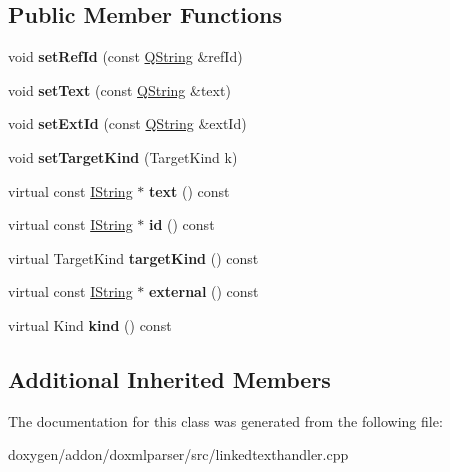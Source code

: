 \subsection*{Public Member Functions}
\begin{DoxyCompactItemize}
\item 
\mbox{\label{class_l_t___ref_aa58a1fa144b337d4412f461280213764}} 
void {\bfseries set\+Ref\+Id} (const \mbox{\hyperlink{class_q_string}{Q\+String}} \&ref\+Id)
\item 
\mbox{\label{class_l_t___ref_ab32809080285a478f177582906941142}} 
void {\bfseries set\+Text} (const \mbox{\hyperlink{class_q_string}{Q\+String}} \&text)
\item 
\mbox{\label{class_l_t___ref_a705a26f4f16c17e4fc0eb22f711dd57a}} 
void {\bfseries set\+Ext\+Id} (const \mbox{\hyperlink{class_q_string}{Q\+String}} \&ext\+Id)
\item 
\mbox{\label{class_l_t___ref_a728f74dfabc691708e49f79e761a04ca}} 
void {\bfseries set\+Target\+Kind} (Target\+Kind k)
\item 
\mbox{\label{class_l_t___ref_a11e182fe3e8af63bf6345d6bc352ef36}} 
virtual const \mbox{\hyperlink{class_i_string}{I\+String}} $\ast$ {\bfseries text} () const
\item 
\mbox{\label{class_l_t___ref_a5253dc5cecf4426e3c6bc33fb65aa381}} 
virtual const \mbox{\hyperlink{class_i_string}{I\+String}} $\ast$ {\bfseries id} () const
\item 
\mbox{\label{class_l_t___ref_a64164b726764dbc65340e47376a116a2}} 
virtual Target\+Kind {\bfseries target\+Kind} () const
\item 
\mbox{\label{class_l_t___ref_a8853fe348762c91c0e1e67f3b20be7ac}} 
virtual const \mbox{\hyperlink{class_i_string}{I\+String}} $\ast$ {\bfseries external} () const
\item 
\mbox{\label{class_l_t___ref_ad701b06c2be9f13d7bb79fa6296c6c97}} 
virtual Kind {\bfseries kind} () const
\end{DoxyCompactItemize}
\subsection*{Additional Inherited Members}


The documentation for this class was generated from the following file\+:\begin{DoxyCompactItemize}
\item 
doxygen/addon/doxmlparser/src/linkedtexthandler.\+cpp\end{DoxyCompactItemize}
